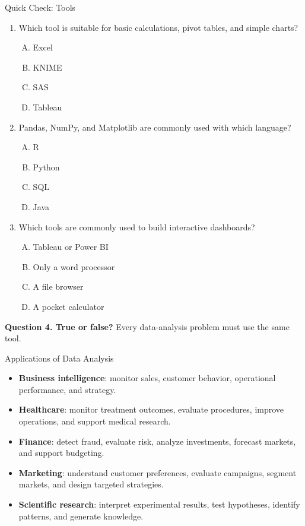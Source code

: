\documentclass[aspectratio=169,11pt]{beamer}
\newcommand{\key}[1]{\textbf{\textcolor{AccentGreen}{#1}}}
\newcommand{\quiztitle}[1]{\textbf{\textcolor{QuizOrange}{#1}}}
\begin{document}
\begin{frame}{Quick Check: Tools}
\begin{enumerate}
  \item Which tool is suitable for basic calculations, pivot tables, and simple charts?
  \begin{enumerate}[A.]
    \item Excel \item KNIME \item SAS \item Tableau
  \end{enumerate}
  \item Pandas, NumPy, and Matplotlib are commonly used with which language?
  \begin{enumerate}[A.]
    \item R \item Python \item SQL \item Java
  \end{enumerate}
  \item Which tools are commonly used to build interactive dashboards?
  \begin{enumerate}[A.]
    \item Tableau or Power BI \item Only a word processor \item A file browser \item A pocket calculator
  \end{enumerate}
\end{enumerate}
\quiztitle{Question 4. True or false?} Every data-analysis problem must use the same tool.
\end{frame}

\begin{frame}{Applications of Data Analysis}
\begin{itemize}
  \item \key{Business intelligence}: monitor sales, customer behavior, operational performance, and strategy.
  \item \key{Healthcare}: monitor treatment outcomes, evaluate procedures, improve operations, and support medical research.
  \item \key{Finance}: detect fraud, evaluate risk, analyze investments, forecast markets, and support budgeting.
  \item \key{Marketing}: understand customer preferences, evaluate campaigns, segment markets, and design targeted strategies.
  \item \key{Scientific research}: interpret experimental results, test hypotheses, identify patterns, and generate knowledge.
\end{itemize}
\end{frame}
\end{document}
